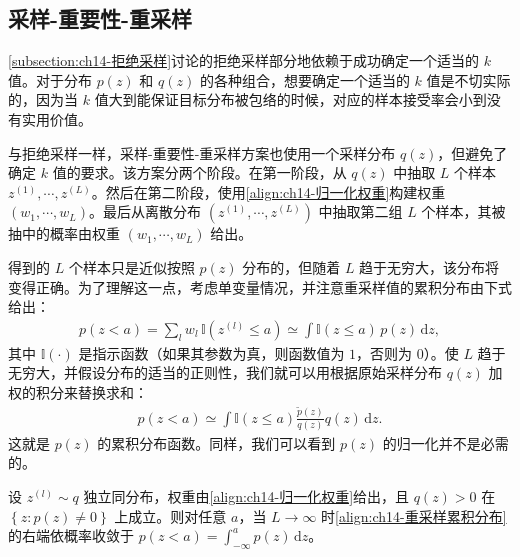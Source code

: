 \documentclass[../../main.tex]{subfiles}
\begin{document}
\subsection{采样-重要性-重采样}\label{subsection:ch14-采样重要性重采样}

\cref{subsection:ch14-拒绝采样}讨论的拒绝采样部分地依赖于成功确定一个适当的 $k$ 值。对于分布 $p(z)$ 和 $q(z)$ 的各种组合，想要确定一个适当的 $k$ 值是不切实际的，因为当 $k$ 值大到能保证目标分布被包络的时候，对应的样本接受率会小到没有实用价值。

与拒绝采样一样，采样-重要性-重采样方案也使用一个采样分布 $q(z)$，但避免了确定 $k$ 值的要求。该方案分两个阶段。在第一阶段，从 $q(z)$ 中抽取 $L$ 个样本 $z^{(1)},\cdots,z^{(L)}$。然后在第二阶段，使用\eqref{align:ch14-归一化权重}构建权重 $\left(w_{1},\cdots,w_{L}\right)$。最后从离散分布 $\left(z^{(1)},\cdots,z^{(L)}\right)$ 中抽取第二组 $L$ 个样本，其被抽中的概率由权重 $\left(w_{1},\cdots,w_{L}\right)$ 给出。

得到的 $L$ 个样本只是近似按照 $p(z)$ 分布的，但随着 $L$ 趋于无穷大，该分布将变得正确。为了理解这一点，考虑单变量情况，并注意重采样值的累积分布由下式给出：
\begin{align}
p(z<a)=\sum_{l}w_{l}\,\mathbb{I}\!\left(z^{(l)}\leqslant a\right)\simeq\int\mathbb{I}(z\leqslant a)\,p(z)\,\mathrm{d}z,
\label{align:ch14-重采样累积分布}
\end{align}
其中 $\mathbb{I}(\cdot)$ 是指示函数（如果其参数为真，则函数值为 $1$，否则为 $0$）。使 $L$ 趋于无穷大，并假设分布的适当的正则性，我们就可以用根据原始采样分布 $q(z)$ 加权的积分来替换求和：
\begin{align}
p(z<a)\simeq\int\mathbb{I}(z\leqslant a)\frac{\widetilde{p}(z)}{q(z)}q(z)\,\mathrm{d}z.
\label{align:ch14-重采样极限}
\end{align}
这就是 $p(z)$ 的累积分布函数。同样，我们可以看到 $p(z)$ 的归一化并不是必需的。

\begin{proposition}[重采样分布的一致性]\label{proposition:ch14-重采样一致性}
设 $z^{(l)}\sim q$ 独立同分布，权重由\eqref{align:ch14-归一化权重}给出，且 $q(z)>0$ 在 $\left\{z:p(z)\neq0\right\}$ 上成立。则对任意 $a$，当 $L\to\infty$ 时\eqref{align:ch14-重采样累积分布}的右端依概率收敛于 $p(z<a)=\int_{-\infty}^{a}p(z)\,\mathrm{d}z$。
\end{proposition}
\end{document}
